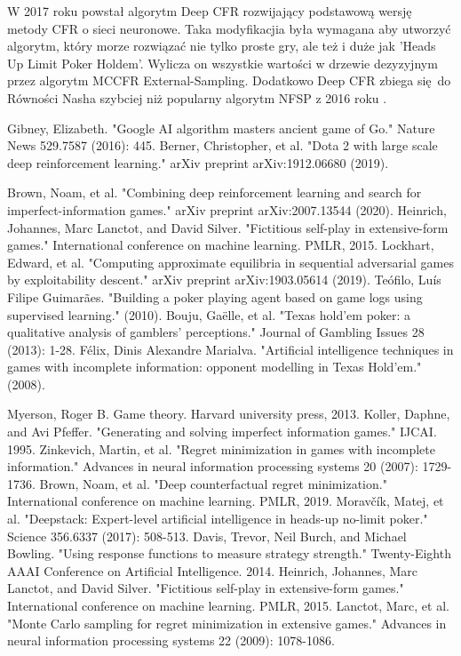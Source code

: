 \documentclass[12pt,oneside,a4paper]{report}
\begin{document}
W 2017 roku powstał algorytm Deep CFR rozwijający podstawową wersję metody CFR o sieci neuronowe.
Taka modyfikacjia była wymagana aby utworzyć algorytm, który morze rozwiązać nie tylko proste gry,
ale też i duże jak 'Heads Up Limit Poker Holdem'. Wylicza on wszystkie wartości w drzewie dezyzyjnym
przez algorytm MCCFR External-Sampling. Dodatkowo Deep CFR zbiega się do Równości Nasha szybciej niż 
popularny algorytm NFSP z 2016 roku \cite{dcfr}.


 

\begin{thebibliography}{100}
    Gibney, Elizabeth. "Google AI algorithm masters ancient game of Go." Nature News 529.7587 (2016): 445.
    Berner, Christopher, et al. "Dota 2 with large scale deep reinforcement learning." arXiv preprint arXiv:1912.06680 (2019).

    Brown, Noam, et al. "Combining deep reinforcement learning and search for imperfect-information games." arXiv preprint arXiv:2007.13544 (2020).
    Heinrich, Johannes, Marc Lanctot, and David Silver. "Fictitious self-play in extensive-form games." International conference on machine learning. PMLR, 2015.
    Lockhart, Edward, et al. "Computing approximate equilibria in sequential adversarial games by exploitability descent." arXiv preprint arXiv:1903.05614 (2019).
    Teófilo, Luís Filipe Guimarães. "Building a poker playing agent based on game logs using supervised learning." (2010).
    Bouju, Gaëlle, et al. "Texas hold'em poker: a qualitative analysis of gamblers' perceptions." Journal of Gambling Issues 28 (2013): 1-28.
    Félix, Dinis Alexandre Marialva. "Artificial intelligence techniques in games with incomplete information: opponent modelling in Texas Hold'em." (2008).

    Myerson, Roger B. Game theory. Harvard university press, 2013.
    Koller, Daphne, and Avi Pfeffer. "Generating and solving imperfect information games." IJCAI. 1995.
    Zinkevich, Martin, et al. "Regret minimization in games with incomplete information." Advances in neural information processing systems 20 (2007): 1729-1736.
    Brown, Noam, et al. "Deep counterfactual regret minimization." International conference on machine learning. PMLR, 2019. 
    Moravčík, Matej, et al. "Deepstack: Expert-level artificial intelligence in heads-up no-limit poker." Science 356.6337 (2017): 508-513. 
    Davis, Trevor, Neil Burch, and Michael Bowling. "Using response functions to measure strategy strength." Twenty-Eighth AAAI Conference on Artificial Intelligence. 2014. 
    Heinrich, Johannes, Marc Lanctot, and David Silver. "Fictitious self-play in extensive-form games." International conference on machine learning. PMLR, 2015. 
    Lanctot, Marc, et al. "Monte Carlo sampling for regret minimization in extensive games." Advances in neural information processing systems 22 (2009): 1078-1086.
\end{thebibliography}
\end{document}
